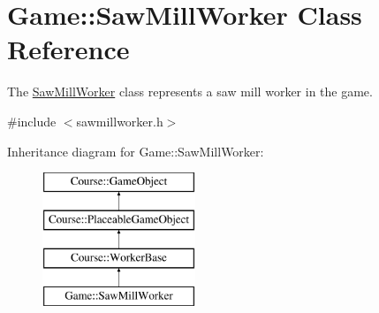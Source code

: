 \hypertarget{classGame_1_1SawMillWorker}{\section{Game\-:\-:Saw\-Mill\-Worker Class Reference}
\label{classGame_1_1SawMillWorker}
}


The \hyperlink{classGame_1_1SawMillWorker}{Saw\-Mill\-Worker} class represents a saw mill worker in the game.  




{\ttfamily \#include $<$sawmillworker.\-h$>$}

Inheritance diagram for Game\-:\-:Saw\-Mill\-Worker\-:\begin{figure}[H]
\begin{center}
\leavevmode
\includegraphics[height=4.000000cm]{classGame_1_1SawMillWorker}
\end{center}
\end{figure}
